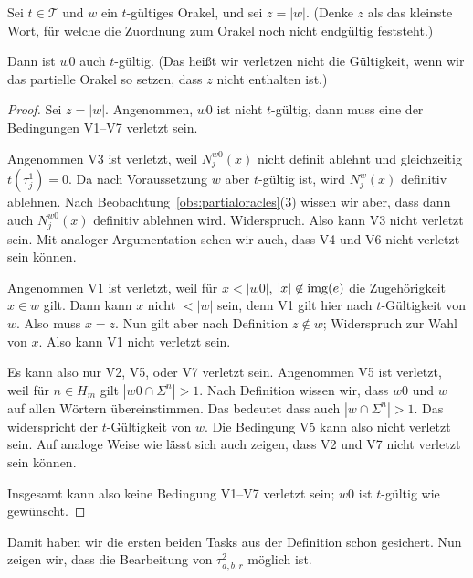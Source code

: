 \begin{lemma}\label{claim:myoracle-up-extension}
    Sei $t\in\mathcal T$ und $w$ ein $t$-gültiges Orakel, und sei $z=|w|$. 
    (Denke $z$ als das kleinste Wort, für welche die Zuordnung zum Orakel noch nicht endgültig feststeht.)

    Dann ist $w0$ auch $t$-gültig. (Das heißt wir verletzen nicht die Gültigkeit, wenn wir das partielle Orakel so setzen, dass $z$ nicht enthalten ist.)
\end{lemma}
\begin{proof}
    Sei $z=|w|$. 
    Angenommen, $w0$ ist nicht $t$-gültig, dann muss eine der Bedingungen V1–V7 verletzt sein.

    Angenommen V3 ist verletzt, weil $N_j^{w0}(x)$ nicht definit ablehnt und gleichzeitig $t(\tau_j^1)=0$. Da nach Voraussetzung $w$ aber $t$-gültig ist, wird $N_j^{w}(x)$ definitiv ablehnen.
    Nach Beobachtung~\ref{obs:partialoracles}(3) wissen wir aber, dass dann auch $N_j^{w0}(x)$ definitiv ablehnen wird. Widerspruch.
    Also kann V3 nicht verletzt sein. Mit analoger Argumentation sehen wir auch, dass V4 und V6 nicht verletzt sein können.

    Angenommen V1 ist verletzt, weil für $x<|w0|$, $|x|\not\in\operatorname{img}(e)$ die Zugehörigkeit $x\in w$ gilt. Dann kann $x$ nicht $<|w|$ sein, denn V1 gilt hier nach $t$-Gültigkeit von $w$. Also muss $x=z$.
    Nun gilt aber nach Definition $z\not\in w$; Widerspruch zur Wahl von $x$. Also kann V1 nicht verletzt sein.

    Es kann also nur V2, V5, oder V7 verletzt sein.
    Angenommen V5 ist verletzt, weil für $n\in H_m$ gilt $|w0\cap\Sigma^n|> 1$.
    Nach Definition wissen wir, dass $w0$ und $w$ auf allen Wörtern übereinstimmen.
    Das bedeutet dass auch $|w\cap\Sigma^n|>1$.
    Das widerspricht der $t$-Gültigkeit von $w$.
    Die Bedingung V5 kann also nicht verletzt sein.
    Auf analoge Weise wie lässt sich auch zeigen, dass V2 und V7 nicht verletzt sein können.

    Insgesamt kann also keine Bedingung V1–V7 verletzt sein; $w0$ ist $t$-gültig wie gewünscht.
\end{proof}

Damit haben wir die ersten beiden Tasks aus der Definition schon gesichert. Nun zeigen wir, dass die Bearbeitung von $\tau^2_{a,b,r}$ möglich ist.

